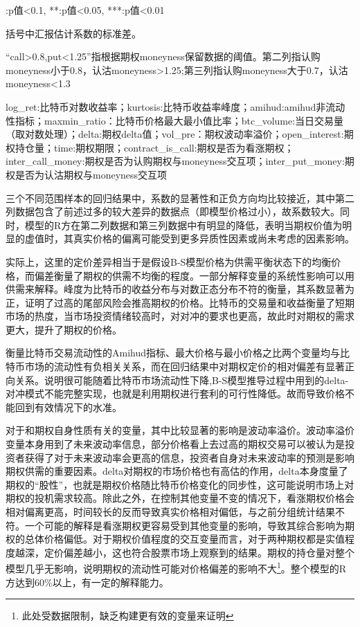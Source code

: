 {\begin{center}
\begin{threeparttable}[H]
\begin{tablenotes}
\footnotesize
\item *:p值<0.1, **:p值<0.05, ***:p值<0.01
\item 括号中汇报估计系数的标准差。
\item “call>0.8,put<1.25”指根据期权moneyness保留数据的阈值。第二列指认购moneyness小于0.8，认沽moneyness>1.25;第三列指认购moneyness大于0.7，认沽moneyness<1.3
\item log\_ret:比特币对数收益率；kurtosis:比特币收益率峰度；amihud:amihud非流动性指标；maxmin\_ratio：比特币价格最大最小值比率；btc\_volume:当日交易量（取对数处理）；delta:期权delta值；vol\_pre：期权波动率溢价；open\_interest:期权持仓量；time:期权期限；contract\_is\_call:期权是否为看涨期权；inter\_call\_money:期权是否为认购期权与moneyness交互项；inter\_put\_money:期权是否为认沽期权与moneyness交互项
\end{tablenotes}
\end{threeparttable}
\end{center}
\newpage
\restoregeometry
\par{三个不同范围样本的回归结果中，系数的显著性和正负方向均比较接近，其中第二列数据包含了前述过多的较大差异的数据点（即模型价格过小），故系数较大。同时，模型的R方在第二列数据和第三列数据中有明显的降低，表明当期权价值为明显的虚值时，其真实价格的偏离可能受到更多异质性因素或尚未考虑的因素影响。}
\par{
实际上，这里的定价差异相当于是假设B-S模型价格为供需平衡状态下的均衡价格，而偏差衡量了期权的供需不均衡的程度。一部分解释变量的系统性影响可以用供需来解释。峰度为比特币的收益分布与对数正态分布不符的衡量，其系数显著为正，证明了过高的尾部风险会推高期权的价格。比特币的交易量和收益衡量了短期市场的热度，当市场投资情绪较高时，对对冲的要求也更高，故此时对期权的需求更大，提升了期权的价格。}
\par{衡量比特币交易流动性的Amihud指标、最大价格与最小价格之比两个变量均与比特币市场的流动性有负相关关系，而在回归结果中对期权定价的相对偏差有显著正向关系。说明很可能随着比特币市场流动性下降,B-S模型推导过程中用到的delta-对冲模式不能完整实现，也就是利用期权进行套利的可行性降低。故而导致价格不能回到有效情况下的水准。
}
\par{对于和期权自身性质有关的变量，其中比较显著的影响是波动率溢价。波动率溢价变量本身用到了未来波动率信息，部分价格看上去过高的期权交易可以被认为是投资者获得了对于未来波动率会更高的信息，投资者自身对未来波动率的预测是影响期权供需的重要因素。delta对期权的市场价格也有高估的作用，delta本身度量了期权的“股性”，也就是期权价格随比特币价格变化的同步性，这可能说明市场上对期权的投机需求较高。除此之外，在控制其他变量不变的情况下，看涨期权价格会相对偏离更高，时间较长的反而导致真实价格相对偏低，与之前分组统计结果不符。一个可能的解释是看涨期权更容易受到其他变量的影响，导致其综合影响为期权的总体价格偏低。对于期权价值程度的交互变量而言，对于两种期权都是实值程度越深，定价偏差越小，这也符合股票市场上观察到的结果。期权的持仓量对整个模型几乎无影响，说明期权的流动性可能对价格偏差的影响不大\footnote{此处受数据限制，缺乏构建更有效的变量来证明}。整个模型的R方达到60$\%$以上，有一定的解释能力。}
}
